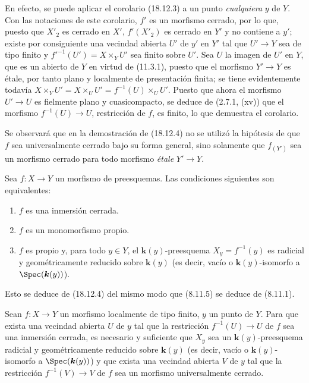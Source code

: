 En efecto, se puede aplicar el corolario (18.12.3) a un punto \emph{cualquiera} $y$ de $Y$. Con las notaciones de este corolario, $f'$ es un morfismo cerrado, por lo que, puesto que $X'_2$ es cerrado en $X'$, $f'(X'_2)$ es cerrado en $Y'$ y no contiene a $y'$; existe por consiguiente una vecindad abierta $U'$ de $y'$ en $Y'$ tal que $U'\to Y$ sea de tipo finito y $f'^{-1}(U')=X\times_Y U'$ sea finito sobre $U'$. Sea $U$ la imagen de $U'$ en $Y$, que es un abierto de $Y$ en virtud de (11.3.1), puesto que el morfismo $Y'\to Y$ es étale, por tanto plano y localmente de presentación finita; se tiene evidentemente todavía $X\times_Y U'=X\times_U U'=f^{-1}(U)\times_U U'$. Puesto que ahora el morfismo $U'\to U$ es fielmente plano y cuasicompacto, se deduce de (2.7.1, (xv)) que el morfismo $f^{-1}(U)\to U$, restricción de $f$, es finito, lo que demuestra el corolario.

\begin{remark}[18.12.5]
\label{IV.18.12.5}
Se observará que en la demostración de (18.12.4) no se utilizó la hipótesis de que $f$ sea universalmente cerrado bajo su forma general, sino solamente que $f_{(Y')}$ sea un morfismo cerrado para todo morfismo \emph{étale} $Y'\to Y$.
\end{remark}

\begin{corollary}[18.12.6]
\label{IV.18.12.6}
Sea $f:X\to Y$ un morfismo de preesquemas. Las condiciones siguientes son equivalentes:
\begin{enumerate}
  \item[\textup{a)}] $f$ es una inmersión cerrada.
  \item[\textup{b)}] $f$ es un monomorfismo propio.
  \item[\textup{c)}] $f$ es propio y, para todo $y\in Y$, el $\boldsymbol{k}(y)$-preesquema $X_y=f^{-1}(y)$ es radicial y geométricamente reducido sobre $\boldsymbol{k}(y)$ (es decir, vacío o $\boldsymbol{k}(y)$-isomorfo a $\Spec(\boldsymbol{k}(y))$).
\end{enumerate}
\end{corollary}

Esto se deduce de (18.12.4) del mismo modo que (8.11.5) se deduce de (8.11.1).

\begin{proposition}[18.12.7]
\label{IV.18.12.7}
Sean $f:X\to Y$ un morfismo localmente de tipo finito, $y$ un punto de $Y$. Para que exista una vecindad abierta $U$ de $y$ tal que la restricción $f^{-1}(U)\to U$ de $f$ sea una inmersión cerrada, es necesario y suficiente que $X_y$ sea un $\boldsymbol{k}(y)$-preesquema radicial y geométricamente reducido sobre $\boldsymbol{k}(y)$ (es decir, vacío o $\boldsymbol{k}(y)$-isomorfo a $\Spec(\boldsymbol{k}(y))$) y que exista una vecindad abierta $V$ de $y$ tal que la restricción $f^{-1}(V)\to V$ de $f$ sea un morfismo universalmente cerrado.
\end{proposition}

